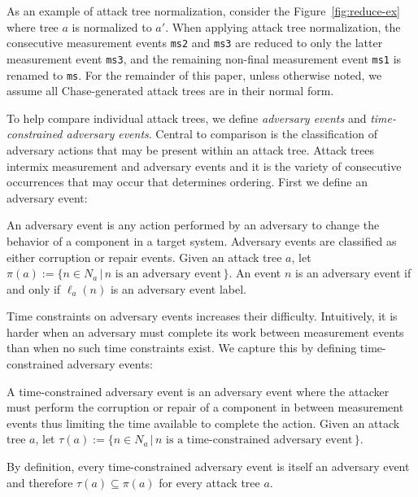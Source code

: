 \documentclass[runningheads]{llncs}
\theoremstyle{definition}
\begin{document}
\noindent As an example of attack tree normalization, consider the
Figure~\ref{fig:reduce-ex} where tree $a$ is normalized to $a'$. When
applying attack tree normalization, the consecutive measurement events
\texttt{ms2} and \texttt{ms3} are reduced to only the latter
measurement event \texttt{ms3}, and the remaining non-final
measurement event \texttt{ms1} is renamed to \texttt{ms}. For the
remainder of this paper, unless otherwise noted, we assume all
Chase-generated attack trees are in their normal form.

To help compare individual attack trees, we define \emph{adversary
  events} and \emph{time-constrained adversary events}. Central to
comparison is the classification of adversary actions that may be
present within an attack tree. Attack trees intermix measurement and
adversary events and it is the variety of consecutive occurrences that
may occur that determines ordering. First we define an adversary
event:

\begin{definition}
  An adversary event is any action performed by an adversary to
  change the behavior of a component in a target system. Adversary
  events are classified as either corruption or repair events. Given
  an attack tree $a$, let $\pi(a) := \{n \in N_a \,|\, n \text{ is
    an adversary event}\,\}$. An event $n$ is an adversary event if
  and only if $\ell_a(n)$ is an adversary event label. 
\end{definition}

Time constraints on adversary events increases their difficulty.
Intuitively, it is harder when an adversary must complete its work
between measurement events than when no such time constraints
exist. We capture this by defining time-constrained adversary events:

\begin{definition}
  A time-constrained adversary event is an adversary event where the
  attacker must perform the corruption or repair of a component in
  between measurement events thus limiting the time available to
  complete the action. Given an attack tree $a$, let $\tau(a) := \{n
  \in N_a \,|\, n \text{ is a time-constrained adversary
    event}\,\}$. 
\end{definition}

\noindent By definition, every time-constrained adversary event is
itself an adversary event and therefore $\tau(a) \subseteq \pi(a)$ for
every attack tree $a$. 
\end{document}

